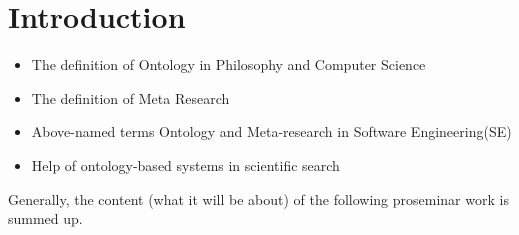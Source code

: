 
\section{Introduction}
\label{ch:Introduction}
\begin{itemize}
	\item The definition of Ontology in Philosophy and Computer Science
	\item The definition of Meta Research
	\item Above-named terms Ontology and Meta-research in Software Engineering(SE)
	\item Help of ontology-based systems in scientific search
\end{itemize}

Generally, the content (what it will be about) of the following proseminar work is summed up.